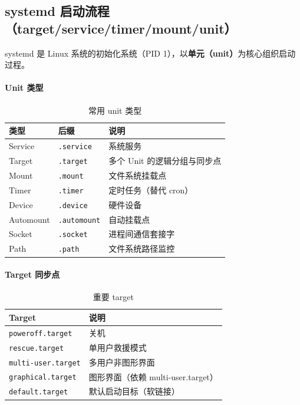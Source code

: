 \documentclass[12pt,UTF8]{ctexbook}
\begin{document}
\subsection{systemd 启动流程（target/service/timer/mount/unit）}
	
systemd 是 Linux 系统的初始化系统（PID 1），以\textbf{单元（unit）}为核心组织启动过程。
	
\paragraph{Unit 类型}

\begin{table}[htbp]
	\centering
	\caption{常用 unit 类型}
	\begin{tabular}{@{}lll@{}}
		\toprule
		\textbf{类型} & \textbf{后缀} & \textbf{说明} \\
		\midrule
		Service & \texttt{.service} & 系统服务 \\
		Target & \texttt{.target} & 多个 Unit 的逻辑分组与同步点 \\
		Mount & \texttt{.mount} & 文件系统挂载点 \\
		Timer & \texttt{.timer} & 定时任务（替代 cron） \\
		Device & \texttt{.device} & 硬件设备 \\
		Automount & \texttt{.automount} & 自动挂载点 \\
		Socket & \texttt{.socket} & 进程间通信套接字 \\
		Path & \texttt{.path} & 文件系统路径监控 \\
		\bottomrule
	\end{tabular}
\end{table}
	
\paragraph{Target 同步点}

\begin{table}[htbp]
	\centering
	\caption{重要 target}
	\begin{tabular}{@{}ll@{}}
		\toprule
		\textbf{Target} & \textbf{说明} \\
		\midrule
		\texttt{poweroff.target} & 关机 \\
		\texttt{rescue.target} & 单用户救援模式 \\
		\texttt{multi-user.target} & 多用户非图形界面 \\
		\texttt{graphical.target} & 图形界面（依赖 multi-user.target） \\
		\texttt{default.target} & 默认启动目标（软链接） \\
		\bottomrule
	\end{tabular}
\end{table}
	
\end{document}

